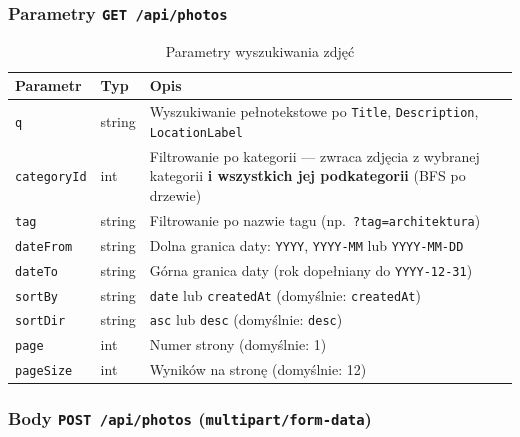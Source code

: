 \documentclass[12pt, a4paper]{article}
\begin{document}
\subsubsection{Parametry \texttt{GET /api/photos}}

\begin{table}[H]
  \centering
  \caption{Parametry wyszukiwania zdjęć}
  \begin{tabular}{@{}L{3cm}L{2cm}L{9cm}@{}}
    \toprule
    \textbf{Parametr} & \textbf{Typ} & \textbf{Opis} \\
    \midrule
    \texttt{q}          & string & Wyszukiwanie pełnotekstowe po \texttt{Title}, \texttt{Description}, \texttt{LocationLabel} \\
    \texttt{categoryId} & int    & Filtrowanie po kategorii --- zwraca zdjęcia z wybranej kategorii \textbf{i wszystkich jej podkategorii} (BFS po drzewie) \\
    \texttt{tag}        & string & Filtrowanie po nazwie tagu (np.\ \texttt{?tag=architektura}) \\
    \texttt{dateFrom}   & string & Dolna granica daty: \texttt{YYYY}, \texttt{YYYY-MM} lub \texttt{YYYY-MM-DD} \\
    \texttt{dateTo}     & string & Górna granica daty (rok dopełniany do \texttt{YYYY-12-31}) \\
    \texttt{sortBy}     & string & \texttt{date} lub \texttt{createdAt} (domyślnie: \texttt{createdAt}) \\
    \texttt{sortDir}    & string & \texttt{asc} lub \texttt{desc} (domyślnie: \texttt{desc}) \\
    \texttt{page}       & int    & Numer strony (domyślnie: 1) \\
    \texttt{pageSize}   & int    & Wyników na stronę (domyślnie: 12) \\
    \bottomrule
  \end{tabular}
\end{table}

\subsubsection{Body \texttt{POST /api/photos} (\texttt{multipart/form-data})}
\end{document}

